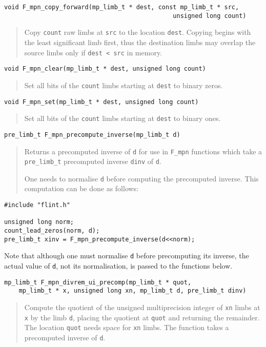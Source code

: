\documentclass[a4paper,10pt]{article}
\newcommand{\code}{\lstinline}
\begin{document}
\begin{lstlisting}
void F_mpn_copy_forward(mp_limb_t * dest, const mp_limb_t * src,  
                                              unsigned long count)
\end{lstlisting}
\begin{quote}
Copy \code{count} raw limbs at \code{src} to the location \code{dest}. Copying begins with the least significant limb first, thus the destination limbs may overlap the source limbs only if \code{dest < src} in memory.
\end{quote}

\begin{lstlisting}
void F_mpn_clear(mp_limb_t * dest, unsigned long count)
\end{lstlisting}
\begin{quote}
Set all bits of the \code{count} limbs starting at \code{dest} to binary zeros.
\end{quote}

\begin{lstlisting}
void F_mpn_set(mp_limb_t * dest, unsigned long count)
\end{lstlisting}
\begin{quote}
Set all bits of the \code{count} limbs starting at \code{dest} to binary ones.
\end{quote}

\begin{lstlisting}
pre_limb_t F_mpn_precompute_inverse(mp_limb_t d)                  
\end{lstlisting}
\begin{quote}
Returns a precomputed inverse of \code{d} for use in \code{F_mpn} functions which take a \code{pre_limb_t} precomputed inverse \code{dinv} of \code{d}. 

One needs to normalise \code{d} before computing the precomputed inverse. This computation can be done as follows:
\end{quote}

\begin{lstlisting}
#include "flint.h"

unsigned long norm;
count_lead_zeros(norm, d);
pre_limb_t xinv = F_mpn_precompute_inverse(d<<norm);
\end{lstlisting}

Note that although one must normalise \code{d} before precomputing its inverse, the actual value of \code{d}, not its normalisation, is passed to the functions below.

\begin{lstlisting}
mp_limb_t F_mpn_divrem_ui_precomp(mp_limb_t * quot, 
    mp_limb_t * x, unsigned long xn, mp_limb_t d, pre_limb_t dinv)
\end{lstlisting}
\begin{quote}
Compute the quotient of the unsigned multiprecision integer of \code{xn} limbs at \code{x} by the limb \code{d}, placing the quotient at \code{quot} and returning the remainder. The location \code{quot} needs space for \code{xn} limbs. The function takes a precomputed inverse of \code{d}.
\end{quote}
             
\end{document}
